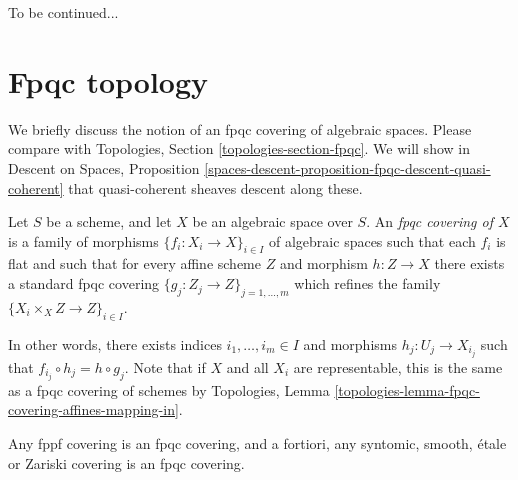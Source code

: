 \noindent
To be continued...











\section{Fpqc topology}
\label{section-fpqc}

\noindent
We briefly discuss the notion of an fpqc covering of algebraic spaces.
Please compare with
Topologies, Section \ref{topologies-section-fpqc}.
We will show in
Descent on Spaces,
Proposition \ref{spaces-descent-proposition-fpqc-descent-quasi-coherent}
that quasi-coherent sheaves descent along these.

\begin{definition}
\label{definition-fpqc-covering}
Let $S$ be a scheme, and let $X$ be an algebraic space over $S$.
An {\it fpqc covering of $X$} is a family of morphisms
$\{f_i : X_i \to X\}_{i \in I}$ of algebraic spaces
such that each $f_i$ is flat and such that for every affine scheme
$Z$ and morphism $h : Z \to X$ there exists a standard fpqc covering
$\{g_j : Z_j \to Z\}_{j = 1, \ldots, m}$ which refines the family
$\{X_i \times_X Z \to Z\}_{i \in I}$.
\end{definition}

\noindent
In other words, there exists indices $i_1, \ldots, i_m \in I$ and
morphisms $h_j : U_j \to X_{i_j}$ such that
$f_{i_j} \circ h_j = h \circ g_j$. Note that if $X$ and all $X_i$ are
representable, this is the same as a fpqc covering of schemes by
Topologies, Lemma \ref{topologies-lemma-fpqc-covering-affines-mapping-in}.

\begin{lemma}
\label{lemma-zariski-etale-smooth-syntomic-fppf-fpqc}
Any fppf covering is an fpqc covering, and a fortiori,
any syntomic, smooth, \'etale or Zariski covering is an fpqc covering.
\end{lemma}

